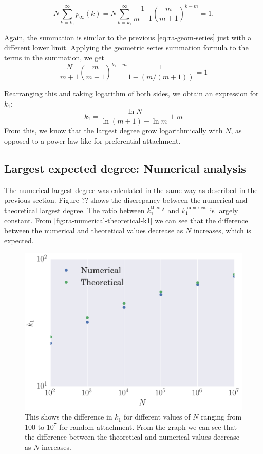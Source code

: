 \begin{equation}
	N \sum_{k=k_1}^\infty p_{\infty}(k) = N \sum_{k=k_1}^\infty \frac{1}{m+1} \left (\frac{m}{m+1} \right )^{k-m} = 1.
	\label{eq:largest-expected-degree-ra-criteria}
\end{equation}

Again, the summation is similar to the previous \autoref{eq:ra-geom-series} just with a different lower limit. Applying the geometric series summation formula to the terms in the summation, we get 
\begin{equation}
	\frac{N}{m+1} \left ( \frac{m}{m+1} \right )^{k_1 - m} \frac{1}{1 - (m / (m+1))} = 1
\end{equation}

Rearranging this and taking logarithm of both sides, we obtain an expression for $k_1$:
\begin{equation}
	k_1 = \frac{\ln N}{\ln (m+1) - \ln m} + m
	\label{eq:largest-degree-ra}
\end{equation}
From this, we know that the largest degree grow logarithmically with $N$, as opposed to a power law like for preferential attachment. 

\subsection{Largest expected degree: Numerical analysis}
The numerical largest degree was calculated in the same way as described in the previous section. Figure ?? shows the discrepancy between the numerical and theoretical largest degree. The ratio between $k_1^{\text{theory}}$ and $k_1^{\text{numerical}}$ is largely constant. From \autoref{fig:ra-numerical-theoretical-k1} we can see that the difference between the numerical and theoretical values decrease as $N$ increases, which is expected. 

\begin{figure}
    \centering
    \includegraphics[height=0.5\linewidth]{img/ra-numerical-theoretical-k1}
    \caption{This shows the difference in $k_1$ for different values of $N$ ranging from $100$ to $10^7$ for random attachment. From the graph we can see that the difference between the theoretical and numerical values decrease as $N$ increases.}
    \label{fig:ra-numerical-theoretical-k1}
\end{figure}


